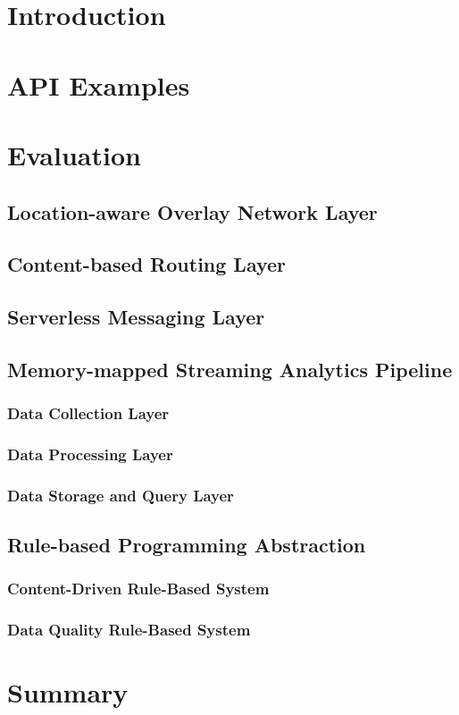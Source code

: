 \section{Introduction}

\section{API Examples}

\section{Evaluation}

\subsection{Location-aware Overlay Network Layer}

\subsection{Content-based Routing Layer}\label{sec:frameworkc}

\subsection{Serverless Messaging Layer}\label{sec:serverless}

\subsection{Memory-mapped Streaming Analytics Pipeline}

\subsubsection{Data Collection Layer}

\subsubsection{Data Processing Layer}

\subsubsection{Data Storage and Query Layer}

\subsection{Rule-based Programming Abstraction}\label{sec:programming-data}

\subsubsection{Content-Driven Rule-Based System}

\subsubsection{Data Quality Rule-Based System}

\section{Summary}